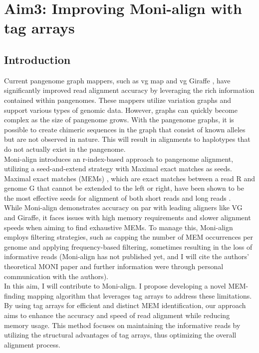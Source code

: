 \documentclass[11pt]{ucthesis}
\begin{document}
 

\chapter{Aim3: Improving Moni-align with tag arrays}

\section{Introduction}
Current pangenome graph mappers, such as vg map \cite{siren2020haplotype} and vg Giraffe \cite{siren2021pangenomics}, have significantly improved read alignment accuracy by leveraging the rich information contained within pangenomes. These mappers utilize variation graphs and support various types of genomic data. However, graphs can quickly become complex as the size of pangenome grows. With the pangenome graphs, it is possible to create chimeric sequences in the graph that consist of known alleles but are not observed in nature. This will result in alignments to haplotypes that do not actually exist in the pangenome. \\
Moni-align \cite{rossi2022moni} introduces an r-index-based approach to pangenome alignment, utilizing a seed-and-extend strategy with Maximal exact matches as seeds. Maximal exact matches (MEMs) \cite{rossi2022moni}, which are exact matches between a read R and genome G that cannot be extended to the left or right, have been shown to be the most effective seeds for alignment of both short reads \cite{li2013aligning} and long reads \cite{vyverman2015long,miclotte2016jabba}.\\
While Moni-align demonstrates accuracy on par with leading aligners like VG and Giraffe, it faces issues with high memory requirements and slower alignment speeds when aiming to find exhaustive MEMs. To manage this, Moni-align employs filtering strategies, such as capping the number of MEM occurrences per genome and applying frequency-based filtering, sometimes resulting in the loss of informative reads (Moni-align has not published yet, and I will cite the authors' theoretical MONI paper and further information were through personal communication with the authors).\\
In this aim, I will contribute to Moni-align. I propose developing a novel MEM-finding mapping algorithm that leverages tag arrays to address these limitations. By using tag arrays for efficient and distinct MEM identification, our approach aims to enhance the accuracy and speed of read alignment while reducing memory usage. This method focuses on maintaining the informative reads by utilizing the structural advantages of tag arrays, thus optimizing the overall alignment process.
\end{document}
